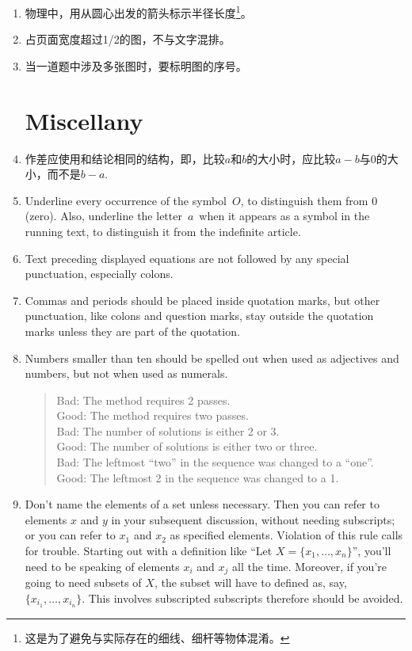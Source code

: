 \documentclass[11pt, a4paper, titlepage]{article}
\begin{document}
\begin{enumerate}
\item 物理中，用从圆心出发的箭头标示半径长度\footnote{这是为了避免与实际存在的细线、细杆等物体混淆。}。

\item 占页面宽度超过1/2的图，不与文字混排。

\item 当一道题中涉及多张图时，要标明图的序号。




\part{Miscellany}
\item 作差应使用和结论相同的结构，即，比较$a$和$b$的大小时，应比较$a-b$与$0$的大小，而不是$b-a$.

\item Underline every occurrence of the symbol $\,O$, to distinguish them from 0 (zero). Also, underline the letter $\,a\,$ when it appears as a symbol in the running text, to distinguish it from the indefinite article.

\item Text preceding displayed equations are not followed by any special punctuation, especially colons.

\item Commas and periods should be placed inside quotation marks, but other punctuation, like colons and question marks, stay outside the quotation marks unless they are part of the quotation.

\item Numbers smaller than ten should be spelled out when used as adjectives and numbers, but not when used as numerals.
    \begin{quote}
    Bad: The method requires 2 passes.\\
    Good: The method requires two passes.\\
    Bad: The number of solutions is either 2 or 3.\\
    Good: The number of solutions is either two or three.\\
    Bad: The leftmost ``two'' in the sequence was changed to a ``one''.\\
    Good: The leftmost 2 in the sequence was changed to a 1.
    \end{quote}

\item Don't name the elements of a set unless necessary. Then you can refer to elements $x$ and $y$ in your subsequent discussion, without needing subscripts; or you can refer to $x_{1}$ and $x_{2}$ as specified elements. Violation of this rule calls for trouble. Starting out with a definition like ``Let $X = \{x_{1},\dots ,x_{n}\}$'', you'll need to be speaking of elements $x_{i}$ and $x_{j}$ all the time. Moreover, if you're going to need subsets of $X$, the subset will have to defined as, say, $\{x_{{i}_{1}},\dots ,x_{{i}_{n}}\}$. This involves subscripted subscripts therefore should be avoided.


\end{enumerate}
\end{document}
